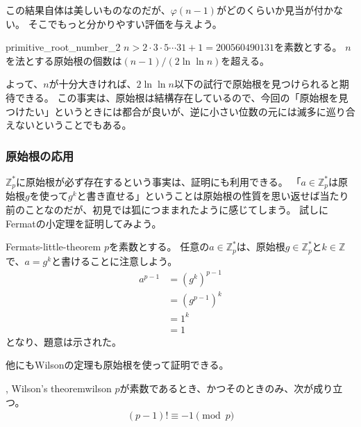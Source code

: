 この結果自体は美しいものなのだが、$\varphi(n-1)$がどのくらいか見当が付かない。
そこでもっと分かりやすい評価を与えよう。

\begin{Prop}{\cite{A_Computational_Perspective}}{primitive_root_number_2}
$n>2\cdot3\cdot5\cdots31+1=200560490131$を素数とする。
$n$を法とする原始根の個数は$(n-1)/(2\ln\ln{n})$を超える。
\end{Prop}

よって、$n$が十分大きければ、$2\ln\ln{n}$以下の試行で原始根を見つけられると期待できる。
この事実は、原始根は結構存在しているので、今回の「原始根を見つけたい」というときには都合が良いが、逆に小さい位数の元には滅多に巡り合えないということでもある。

\subsubsection{原始根の応用}
$\mathbb{Z}_p^*$に原始根が必ず存在するという事実は、証明にも利用できる。
「$a\in\mathbb{Z}_p^*$は原始根$g$を使って$g^k$と書き直せる」ということは原始根の性質を思い返せば当たり前のことなのだが、初見では狐につままれたように感じてしまう。
試しにFermatの小定理を証明してみよう。

\begin{thProof}{Fermats-little-theorem}
$p$を素数とする。
任意の$a\in\mathbb{Z}_p^*$は、原始根$g\in\mathbb{Z}_p^*$と$k\in\mathbb{Z}$で、$a=g^k$と書けることに注意しよう。
\begin{align*}
a^{p-1} &= (g^k)^{p-1}\\
 &= (g^{p-1})^k\\
 &= 1^k \\
 &= 1
\end{align*}
となり、題意は示された。
\end{thProof}

他にもWilsonの定理も原始根を使って証明できる。

\begin{Theo}{, Wilson's theorem}{wilson}
$p$が素数であるとき、かつそのときのみ、次が成り立つ。
\begin{align*}
(p-1)! \equiv -1 \pmod{p}
\end{align*}
\end{Theo}

